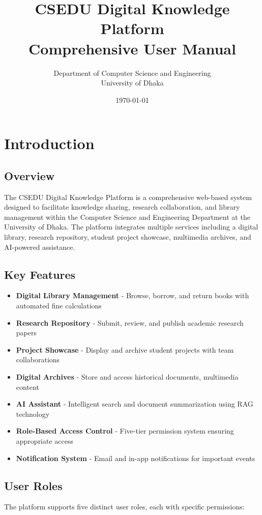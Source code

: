 \documentclass[12pt,a4paper]{article}
\title{\textbf{\Huge CSEDU Digital Knowledge Platform}\\
\vspace{0.5cm}
\Large Comprehensive User Manual}
\author{Department of Computer Science and Engineering\\
University of Dhaka}
\date{\today}
\begin{document}
\maketitle
\thispagestyle{empty}
\newpage

\tableofcontents
\newpage

\section{Introduction}

\subsection{Overview}
The CSEDU Digital Knowledge Platform is a comprehensive web-based system designed to facilitate knowledge sharing, research collaboration, and library management within the Computer Science and Engineering Department at the University of Dhaka. The platform integrates multiple services including a digital library, research repository, student project showcase, multimedia archives, and AI-powered assistance.

\subsection{Key Features}
\begin{itemize}[leftmargin=*]
    \item \textbf{Digital Library Management} - Browse, borrow, and return books with automated fine calculations
    \item \textbf{Research Repository} - Submit, review, and publish academic research papers
    \item \textbf{Project Showcase} - Display and archive student projects with team collaborations
    \item \textbf{Digital Archives} - Store and access historical documents, multimedia content
    \item \textbf{AI Assistant} - Intelligent search and document summarization using RAG technology
    \item \textbf{Role-Based Access Control} - Five-tier permission system ensuring appropriate access
    \item \textbf{Notification System} - Email and in-app notifications for important events
\end{itemize}

\subsection{User Roles}
The platform supports five distinct user roles, each with specific permissions:
\end{document}
